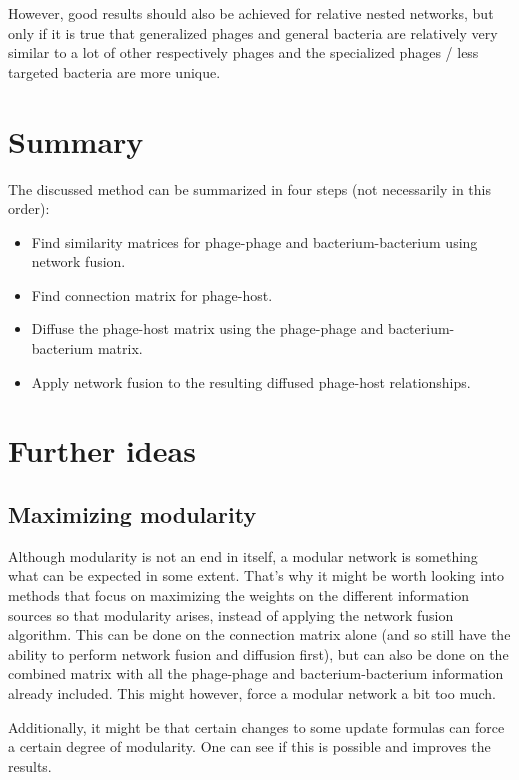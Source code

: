 \documentclass{article}
\begin{document}
However, good results should also be achieved for relative nested networks,
but only if it is 
true that generalized phages and general bacteria are relatively very 
similar to a lot of other respectively phages and 
the specialized phages / less targeted bacteria are more unique. 

\section{Summary}

The discussed method can be summarized in four steps (not necessarily in this order):

\begin{itemize}
\item Find similarity matrices for phage-phage and bacterium-bacterium using network fusion.
\item Find connection matrix for phage-host.
\item Diffuse the phage-host matrix using the phage-phage and bacterium-bacterium matrix.
\item Apply network fusion to the resulting diffused phage-host relationships.
\end{itemize}

\section{Further ideas}

\subsection{Maximizing modularity}

Although modularity is not an end in itself, a modular network is
something what can be expected in some extent.
That's why it might be worth looking into methods 
that focus on maximizing
the weights on the different information sources so that modularity arises,
instead of applying the network fusion algorithm.
This can be done on the connection matrix alone 
(and so still have the ability to perform network fusion and diffusion first),
but can also be done on the combined matrix with 
all the phage-phage and bacterium-bacterium information already included.  
This might however, force a modular network a bit too much.

Additionally, it might be that certain changes to some update formulas can
force a certain degree of modularity. One can see if this is possible and
improves the results.
\end{document}
